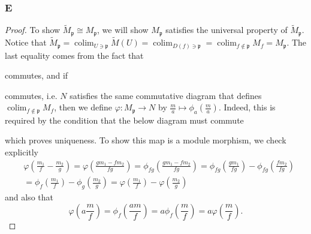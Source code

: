 \documentclass{article}
\newcommand{\frkp}{\mathfrak{p}}
\DeclareMathOperator{\colim}{\mathrm{colim}}
\begin{document}
\subsubsection{E}\label{4.1.E}
\begin{proof}
    To show $\widetilde M_\frkp \cong M_\frkp$, we will show $M_\frkp$ satisfies the universal property of $\widetilde M_\frkp$. Notice that $\widetilde M_\frkp = \colim_{U \ni \frkp} \widetilde M(U) = \colim_{D(f) \ni \frkp} = \colim_{f\notin \frkp} M_f = M_\frkp$. The last equality comes from the fact that 
    \begin{center}
    \end{center}
    commutes, and if 
    \begin{center}
    \end{center}
    commutes, i.e. $N$ satisfies the same commutative diagram that defines $\colim_{f\notin \frkp} M_f$, then we define $\varphi: M_\frkp \to N$ by $\frac{m}{a}\mapsto \phi_a(\frac{m}{a})$. Indeed, this is required by the condition that the below diagram must commute 
    \begin{center}
    \end{center}
    which proves uniqueness. To show this map is a module morphism, we check explicitly 
    \begin{align*}
        &\varphi(\frac{m_1}{f}-\frac{m_2}{g}) = \varphi(\frac{gm_1-fm_2}{fg}) = \phi_{fg}(\frac{gm_1-fm_2}{fg}) = \phi_{fg}(\frac{gm_1}{fg})-\phi_{fg}(\frac{fm_2}{fg})\\
        &=\phi_f(\frac{m_1}{f})-\phi_g(\frac{m_2}{g}) = \varphi(\frac{m_1}{f})-\varphi(\frac{m_2}{g})
    \end{align*}
    and also that
    \[
    \varphi(a \frac{m}{f})=\phi_f(\frac{am}{f})=a\phi_f(\frac{m}{f})=a\varphi(\frac{m}{f}).
    \]
\end{proof}
\end{document}
